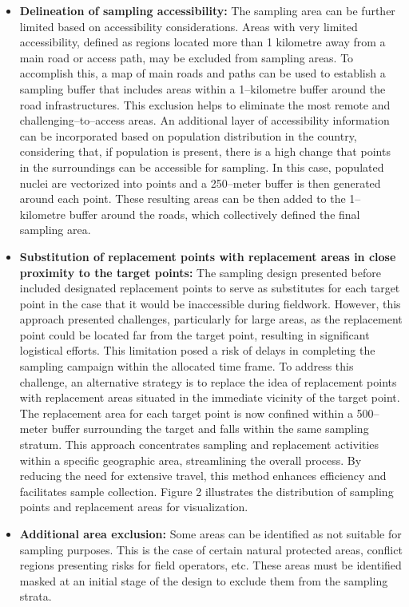 \documentclass[
  10pt,
  b5paper,
  oneside]{book}
\begin{document}
\begin{itemize}
\item
  \textbf{Delineation of sampling accessibility:} The sampling area can be further limited based on accessibility considerations. Areas with very limited accessibility, defined as regions located more than 1 kilometre away from a main road or access path, may be excluded from sampling areas. To accomplish this, a map of main roads and paths can be used to establish a sampling buffer that includes areas within a 1--kilometre buffer around the road infrastructures. This exclusion helps to eliminate the most remote and challenging--to--access areas. An additional layer of accessibility information can be incorporated based on population distribution in the country, considering that, if population is present, there is a high change that points in the surroundings can be accessible for sampling. In this case, populated nuclei are vectorized into points and a 250--meter buffer is then generated around each point. These resulting areas can be then added to the 1--kilometre buffer around the roads, which collectively defined the final sampling area.
\item
  \textbf{Substitution of replacement points with replacement areas in close proximity to the target points:} The sampling design presented before included designated replacement points to serve as substitutes for each target point in the case that it would be inaccessible during fieldwork. However, this approach presented challenges, particularly for large areas, as the replacement point could be located far from the target point, resulting in significant logistical efforts. This limitation posed a risk of delays in completing the sampling campaign within the allocated time frame. To address this challenge, an alternative strategy is to replace the idea of replacement points with replacement areas situated in the immediate vicinity of the target point. The replacement area for each target point is now confined within a 500--meter buffer surrounding the target and falls within the same sampling stratum. This approach concentrates sampling and replacement activities within a specific geographic area, streamlining the overall process. By reducing the need for extensive travel, this method enhances efficiency and facilitates sample collection. Figure 2 illustrates the distribution of sampling points and replacement areas for visualization.
\item
  \textbf{Additional area exclusion:} Some areas can be identified as not suitable for sampling purposes. This is the case of certain natural protected areas, conflict regions presenting risks for field operators, etc. These areas must be identified masked at an initial stage of the design to exclude them from the sampling strata.
\end{itemize}
\end{document}
